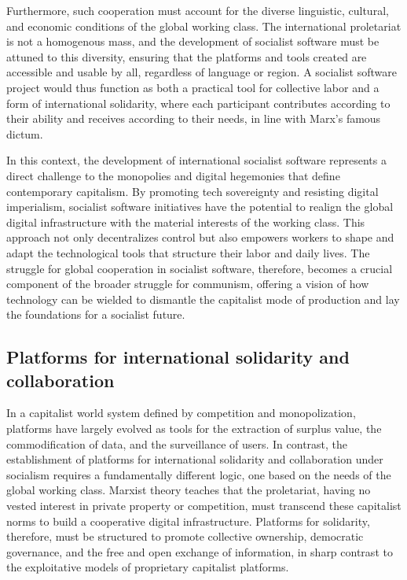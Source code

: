 \begin{refsection}
Furthermore, such cooperation must account for the diverse linguistic, cultural, and economic conditions of the global working class. The international proletariat is not a homogenous mass, and the development of socialist software must be attuned to this diversity, ensuring that the platforms and tools created are accessible and usable by all, regardless of language or region. A socialist software project would thus function as both a practical tool for collective labor and a form of international solidarity, where each participant contributes according to their ability and receives according to their needs, in line with Marx's famous dictum.

In this context, the development of international socialist software represents a direct challenge to the monopolies and digital hegemonies that define contemporary capitalism. By promoting tech sovereignty and resisting digital imperialism, socialist software initiatives have the potential to realign the global digital infrastructure with the material interests of the working class. This approach not only decentralizes control but also empowers workers to shape and adapt the technological tools that structure their labor and daily lives. The struggle for global cooperation in socialist software, therefore, becomes a crucial component of the broader struggle for communism, offering a vision of how technology can be wielded to dismantle the capitalist mode of production and lay the foundations for a socialist future.

\cite[pp.~10-14]{marx_capital_vol1} \cite[pp.~22-27]{engels_anti_duhring} \cite[pp.~33-35]{lenin_imperialism}

\subsection{Platforms for international solidarity and collaboration}

In a capitalist world system defined by competition and monopolization, platforms have largely evolved as tools for the extraction of surplus value, the commodification of data, and the surveillance of users. In contrast, the establishment of platforms for international solidarity and collaboration under socialism requires a fundamentally different logic, one based on the needs of the global working class. Marxist theory teaches that the proletariat, having no vested interest in private property or competition, must transcend these capitalist norms to build a cooperative digital infrastructure. Platforms for solidarity, therefore, must be structured to promote collective ownership, democratic governance, and the free and open exchange of information, in sharp contrast to the exploitative models of proprietary capitalist platforms.


\end{refsection}

